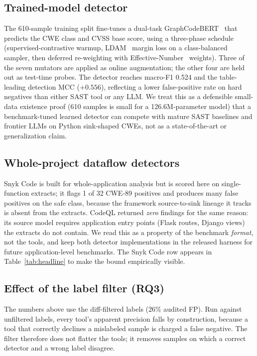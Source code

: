 \documentclass[conference]{IEEEtran}
\begin{document}
\subsection{Trained-model detector}
The 610-sample training split fine-tunes a dual-task
GraphCodeBERT~\cite{graphcodebert} that predicts the CWE class and CVSS
base score, using a three-phase schedule (supervised-contrastive warmup,
LDAM~\cite{cao2019ldam} margin loss on a class-balanced sampler, then
deferred re-weighting with Effective-Number~\cite{cui2019cb} weights).
Three of the seven mutators are applied as online augmentation; the other
four are held out as test-time probes. The detector reaches macro-F1
0.524 and the table-leading detection MCC ($+0.556$), reflecting a lower
false-positive rate on hard negatives than either SAST tool or any LLM.
We treat this as a defensible small-data existence proof (610 samples is
small for a 126.6M-parameter model) that a benchmark-tuned learned
detector can compete with mature SAST baselines and frontier LLMs on
Python sink-shaped CWEs, not as a state-of-the-art or
generalization claim.

\subsection{Whole-project dataflow detectors}
\label{sec:eval:shape}
Snyk Code is built for whole-application analysis but is scored here on
single-function extracts; it flags 1 of 32 CWE-89 positives and produces
many false positives on the safe class, because the framework
source-to-sink lineage it tracks is absent from the extracts. CodeQL
returned \emph{zero} findings for the same reason: its source model
requires application entry points (Flask routes, Django views) the
extracts do not contain. We read this as a property of the benchmark
\emph{format}, not the tools, and keep both detector implementations in
the released harness for future application-level benchmarks. The Snyk
Code row appears in Table~\ref{tab:headline} to make the bound
empirically visible.

\subsection{Effect of the label filter (RQ3)}
The numbers above use the diff-filtered labels (26\% audited FP). Run
against unfiltered labels, every tool's apparent precision falls by
construction, because a tool that correctly declines a mislabeled sample
is charged a false negative. The filter therefore does not flatter the
tools; it removes samples on which a correct detector and a wrong label
disagree.
\end{document}
